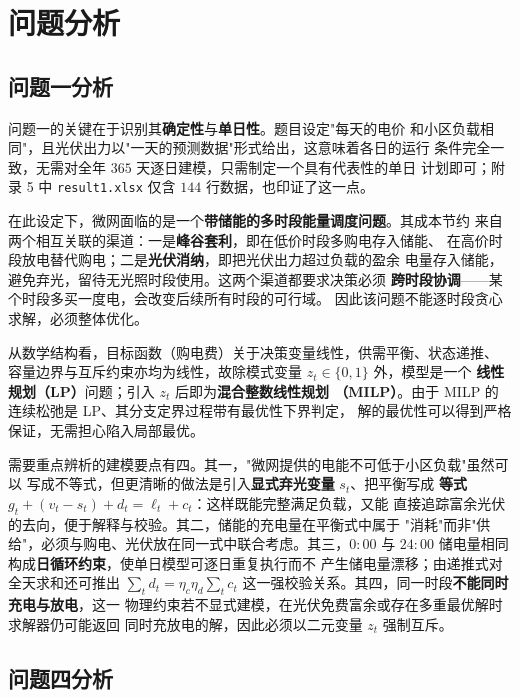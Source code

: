 \documentclass[withoutpreface,bwprint]{cumcmthesis}
\begin{document}
\section{问题分析}

\subsection{问题一分析}

问题一的关键在于识别其\textbf{确定性}与\textbf{单日性}。题目设定"每天的电价
和小区负载相同"，且光伏出力以"一天的预测数据"形式给出，这意味着各日的运行
条件完全一致，无需对全年 $365$ 天逐日建模，只需制定一个具有代表性的单日
计划即可；附录 5 中 \texttt{result1.xlsx} 仅含 $144$ 行数据，也印证了这一点。

在此设定下，微网面临的是一个\textbf{带储能的多时段能量调度问题}。其成本节约
来自两个相互关联的渠道：一是\textbf{峰谷套利}，即在低价时段多购电存入储能、
在高价时段放电替代购电；二是\textbf{光伏消纳}，即把光伏出力超过负载的盈余
电量存入储能，避免弃光，留待无光照时段使用。这两个渠道都要求决策必须
\textbf{跨时段协调}——某个时段多买一度电，会改变后续所有时段的可行域。
因此该问题不能逐时段贪心求解，必须整体优化。

从数学结构看，目标函数（购电费）关于决策变量线性，供需平衡、状态递推、
容量边界与互斥约束亦均为线性，故除模式变量 $z_t \in \{0,1\}$ 外，模型是一个
\textbf{线性规划（LP）}问题；引入 $z_t$ 后即为\textbf{混合整数线性规划
（MILP）}。由于 MILP 的连续松弛是 LP、其分支定界过程带有最优性下界判定，
解的最优性可以得到严格保证，无需担心陷入局部最优。

需要重点辨析的建模要点有四。其一，"微网提供的电能不可低于小区负载"虽然可以
写成不等式，但更清晰的做法是引入\textbf{显式弃光变量} $s_t$、把平衡写成
\textbf{等式} $g_t+(v_t-s_t)+d_t=\ell_t+c_t$：这样既能完整满足负载，又能
直接追踪富余光伏的去向，便于解释与校验。其二，储能的充电量在平衡式中属于
"消耗"而非"供给"，必须与购电、光伏放在同一式中联合考虑。其三，$0{:}00$ 与
$24{:}00$ 储电量相同构成\textbf{日循环约束}，使单日模型可逐日重复执行而不
产生储电量漂移；由递推式对全天求和还可推出 $\sum_t d_t = \eta_c\eta_d
\sum_t c_t$ 这一强校验关系。其四，同一时段\textbf{不能同时充电与放电}，这一
物理约束若不显式建模，在光伏免费富余或存在多重最优解时求解器仍可能返回
同时充放电的解，因此必须以二元变量 $z_t$ 强制互斥。

\subsection{问题四分析}
\end{document}

